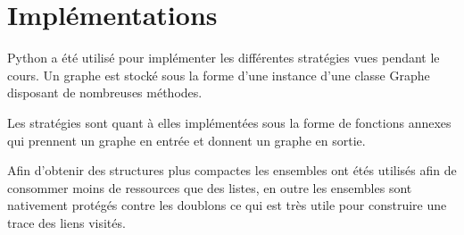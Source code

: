 \section{Implémentations}

Python a été utilisé pour implémenter les
 différentes stratégies vues pendant le cours.
Un graphe est stocké sous la forme d'une instance d'une classe Graphe disposant
de nombreuses méthodes.

Les stratégies sont quant à elles implémentées sous la forme de fonctions annexes qui
prennent un graphe en entrée et donnent un graphe en sortie.

Afin d'obtenir des structures plus compactes les ensembles ont étés utilisés afin de
consommer moins de ressources que des listes, en outre les ensembles sont nativement 
protégés contre les doublons ce qui est très utile pour construire une trace des liens
visités.
